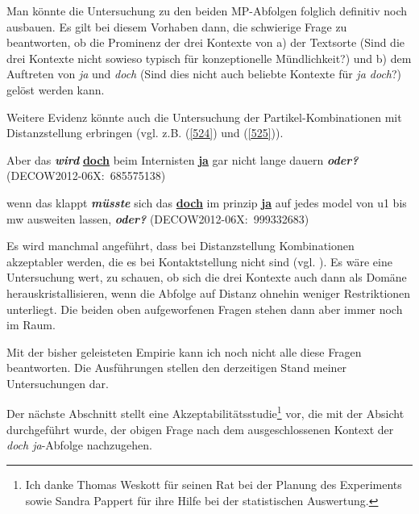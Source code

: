 Man könnte die Untersuchung zu den beiden MP-Abfolgen folglich definitiv noch ausbauen. Es gilt bei diesem Vorhaben dann, die schwierige Frage zu beantworten, ob die Prominenz der drei Kontexte von a) der Textsorte (Sind die drei Kontexte nicht sowieso typisch für  konzeptionelle Mündlichkeit?) und b) dem Auftreten von \textit{ja} und \textit{doch} (Sind dies nicht auch beliebte Kontexte für \textit{ja doch}?) gelöst werden kann.

Weitere Evidenz könnte auch die Untersuchung der Partikel-Kombinationen mit Distanzstellung erbringen (vgl. z.B. (\ref{524}) und (\ref{525})).
	
\begin{exe}
	\ex\label{524} 
	Aber das \textit{\textbf{wird}} \underline{\textbf{doch}} beim Internisten \underline{\textbf{ja}} gar nicht lange dauern 			\textbf{\textit{oder?}}
	\newline
	\hbox{}\hfill\hbox{(DECOW2012-06X: 685575138)}
\end{exe}		

\begin{exe}
	\ex\label{525} 
	wenn das klappt \textbf{\textit{müsste}} sich das \underline{\textbf{doch}} im prinzip \underline{\textbf{ja}} auf jedes 			model von u1 bis mw ausweiten lassen, \textbf{\textit{oder?}}                                                 
	\hfill\hbox{(DECOW2012-06X: 999332683)}
\end{exe}		
Es wird manchmal angeführt, dass bei Distanzstellung  Kombinationen akzep\-tabler werden, die es bei Kontaktstellung  nicht sind (vgl. \citealt[219]{Dahl1988}). Es wäre eine Untersuchung wert, zu schauen, ob sich die drei Kontexte auch dann als Domäne herauskristallisieren, wenn die Abfolge auf Distanz ohnehin weniger Restriktionen unterliegt. Die beiden oben aufgeworfenen Fragen stehen dann aber immer noch im Raum.

Mit der bisher geleisteten Empirie kann ich noch nicht alle diese Fragen beantworten. Die Ausführungen stellen den derzeitigen Stand meiner Untersuchungen dar.

Der nächste Abschnitt stellt eine Akzeptabilitätsstudie\footnote{Ich danke Thomas Weskott für seinen Rat bei der Planung des Experiments sowie Sandra Pappert für ihre Hilfe bei der statistischen Auswertung.} vor, die mit der Absicht durchgeführt wurde, der obigen Frage nach dem ausgeschlossenen Kontext der \textit{doch ja}-Abfolge nachzugehen.


